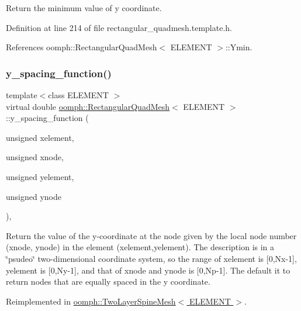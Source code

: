 Return the minimum value of y coordinate. 



Definition at line 214 of file rectangular\+\_\+quadmesh.\+template.\+h.



References oomph\+::\+Rectangular\+Quad\+Mesh$<$ E\+L\+E\+M\+E\+N\+T $>$\+::\+Ymin.

\mbox{\label{classoomph_1_1RectangularQuadMesh_ae78204de1f176cdf2e819673bd34e78a}} 
\subsubsection{\texorpdfstring{y\+\_\+spacing\+\_\+function()}{y\_spacing\_function()}}
{\footnotesize\ttfamily template$<$class E\+L\+E\+M\+E\+NT $>$ \\
virtual double \hyperlink{classoomph_1_1RectangularQuadMesh}{oomph\+::\+Rectangular\+Quad\+Mesh}$<$ E\+L\+E\+M\+E\+NT $>$\+::y\+\_\+spacing\+\_\+function (\begin{DoxyParamCaption}\item[{unsigned}]{xelement,  }\item[{unsigned}]{xnode,  }\item[{unsigned}]{yelement,  }\item[{unsigned}]{ynode }\end{DoxyParamCaption})\hspace{0.3cm}{\ttfamily [inline]}, {\ttfamily [virtual]}}



Return the value of the y-\/coordinate at the node given by the local node number (xnode, ynode) in the element (xelement,yelement). The description is in a \char`\"{}psudeo\char`\"{} two-\/dimensional coordinate system, so the range of xelement is \mbox{[}0,Nx-\/1\mbox{]}, yelement is \mbox{[}0,Ny-\/1\mbox{]}, and that of xnode and ynode is \mbox{[}0,Np-\/1\mbox{]}. The default it to return nodes that are equally spaced in the y coordinate. 



Reimplemented in \hyperlink{classoomph_1_1TwoLayerSpineMesh_a2d05d5228e3831021ab48dd429ada890}{oomph\+::\+Two\+Layer\+Spine\+Mesh$<$ E\+L\+E\+M\+E\+N\+T $>$}.



